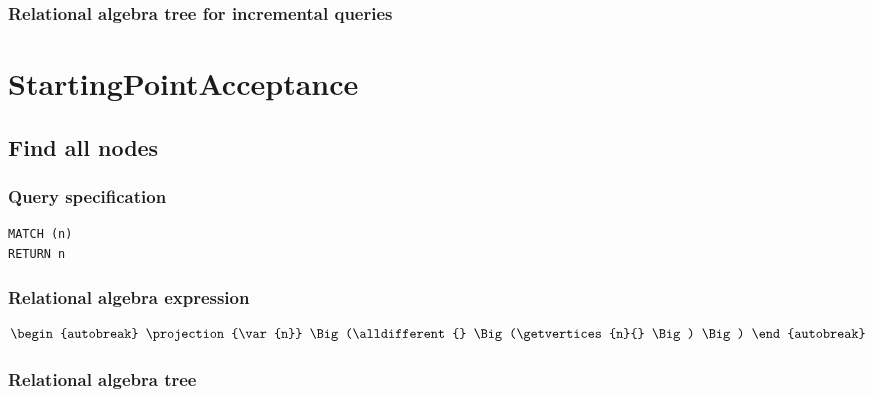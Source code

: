 \subsubsection*{Relational algebra tree for incremental queries}

\section{StartingPointAcceptance}


\subsection{Find all nodes}

\subsubsection*{Query specification}

\begin{lstlisting}
MATCH (n)
RETURN n
\end{lstlisting}

\subsubsection*{Relational algebra expression}

\begin{align*}
\begin{autobreak}
\projection{\var{n}} \Big(\alldifferent{} \Big(\getvertices{n}{}
\Big)
\Big)
\end{autobreak}
\end{align*}

\subsubsection*{Relational algebra tree}


